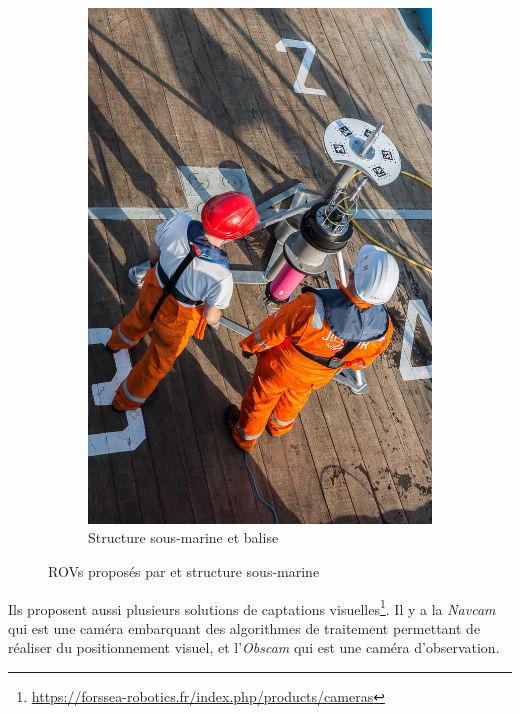 \begin{figure}[!htb]
\begin{subfigure}[b]{0.3\textwidth}
					\caption{\atoll{}}
				\end{subfigure}
				\hfill
				\begin{subfigure}[b]{0.3\textwidth}
					\centering
					\includegraphics[width=\textwidth]{imgs/Frame.jpg}
					\caption{Structure sous-marine et balise}
				\end{subfigure}
				\caption{\gls{ROV}s proposés par \forssea{} et structure sous-marine}
				\label{fig:ROVs}
			\end{figure}

			Ils proposent aussi plusieurs solutions de captations visuelles\footnote{\url{https://forssea-robotics.fr/index.php/products/cameras}}. Il y a la \textit{Navcam} qui est une caméra embarquant des algorithmes de traitement permettant de réaliser du positionnement visuel, et l'\textit{Obscam} qui est une caméra d'observation.

